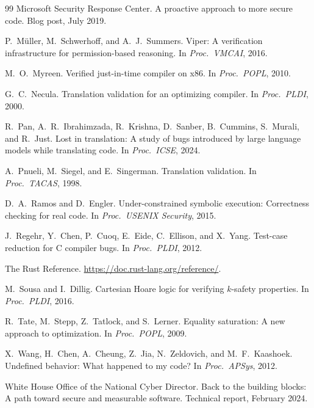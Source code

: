 \documentclass[11pt]{article}
\begin{document}
\begin{thebibliography}{99}
{Microsoft Security Response Center}.
\newblock A proactive approach to more secure code.
\newblock Blog post, July 2019.

P.~M\"uller, M.~Schwerhoff, and A.~J.~Summers.
\newblock Viper: A verification infrastructure for permission-based reasoning.
\newblock In \emph{Proc.\ VMCAI}, 2016.

M.~O.~Myreen.
\newblock Verified just-in-time compiler on x86.
\newblock In \emph{Proc.\ POPL}, 2010.

G.~C.~Necula.
\newblock Translation validation for an optimizing compiler.
\newblock In \emph{Proc.\ PLDI}, 2000.

R.~Pan, A.~R.~Ibrahimzada, R.~Krishna, D.~Sanber, B.~Cummins, S.~Murali, and R.~Just.
\newblock Lost in translation: A study of bugs introduced by large language models while translating code.
\newblock In \emph{Proc.\ ICSE}, 2024.

A.~Pnueli, M.~Siegel, and E.~Singerman.
\newblock Translation validation.
\newblock In \emph{Proc.\ TACAS}, 1998.

D.~A.~Ramos and D.~Engler.
\newblock Under-constrained symbolic execution: Correctness checking for real code.
\newblock In \emph{Proc.\ USENIX Security}, 2015.

J.~Regehr, Y.~Chen, P.~Cuoq, E.~Eide, C.~Ellison, and X.~Yang.
\newblock Test-case reduction for C compiler bugs.
\newblock In \emph{Proc.\ PLDI}, 2012.

{The Rust Reference}.
\newblock \url{https://doc.rust-lang.org/reference/}.

M.~Sousa and I.~Dillig.
\newblock Cartesian Hoare logic for verifying $k$-safety properties.
\newblock In \emph{Proc.\ PLDI}, 2016.

R.~Tate, M.~Stepp, Z.~Tatlock, and S.~Lerner.
\newblock Equality saturation: A new approach to optimization.
\newblock In \emph{Proc.\ POPL}, 2009.

X.~Wang, H.~Chen, A.~Cheung, Z.~Jia, N.~Zeldovich, and M.~F.~Kaashoek.
\newblock Undefined behavior: What happened to my code?
\newblock In \emph{Proc.\ APSys}, 2012.

{White House Office of the National Cyber Director}.
\newblock Back to the building blocks: A path toward secure and measurable software.
\newblock Technical report, February 2024.


\end{thebibliography}
\end{document}
